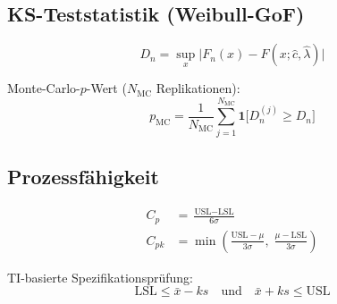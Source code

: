 \documentclass[10pt,a4paper,twocolumn]{article}
\theoremstyle{definition}
\newcommand{\xbar}{\bar{x}}
\begin{document}
\subsection{KS-Teststatistik (Weibull-GoF)}

\begin{equation}
    D_n = \sup_x \big|F_n(x) - F(x;\hat{c},\hat{\lambda})\big|
\end{equation}

Monte-Carlo-$p$-Wert ($N_{\text{MC}}$ Replikationen):
\begin{equation}
    p_{\text{MC}} = \frac{1}{N_{\text{MC}}}
    \sum_{j=1}^{N_{\text{MC}}} \mathbf{1}\big[D_n^{(j)} \geq D_n\big]
\end{equation}

\subsection{Prozessfähigkeit}

\begin{align}
    C_p &= \frac{\text{USL} - \text{LSL}}{6\sigma} \\[4pt]
    C_{pk} &= \min\!\left(
        \frac{\text{USL} - \mu}{3\sigma},\;
        \frac{\mu - \text{LSL}}{3\sigma}
    \right)
\end{align}

TI-basierte Spezifikationsprüfung:
\begin{equation}
    \text{LSL} \leq \xbar - ks
    \quad\text{und}\quad
    \xbar + ks \leq \text{USL}
\end{equation}

\end{document}
